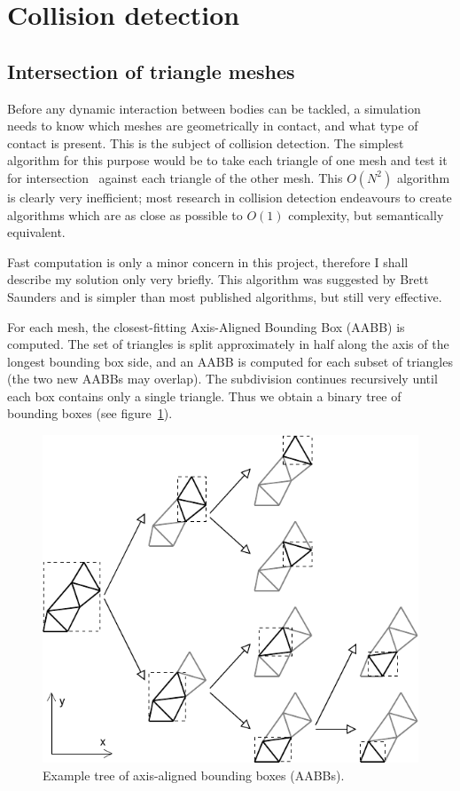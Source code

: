 \section{Collision detection\label{collisionDetection}}

\subsection{Intersection of triangle meshes}

Before any dynamic interaction between bodies can be tackled, a simulation needs to know which
meshes are geometrically in contact, and what type of contact is present. This is the subject
of collision detection. The simplest algorithm for this purpose would be to take each triangle
of one mesh and test it for intersection~\cite{Moeller:97} against each triangle of the other
mesh. This $O(N^2)$ algorithm is clearly very inefficient; most research in collision detection
endeavours to create algorithms which are as close as possible to $O(1)$ complexity, but
semantically equivalent.

Fast computation is only a minor concern in this project, therefore I shall describe my solution
only very briefly. This algorithm was suggested by Brett Saunders and is simpler than most
published algorithms, but still very effective.

For each mesh, the closest-fitting Axis-Aligned Bounding Box (AABB) is computed. The set of
triangles is split approximately in half along the axis of the longest bounding box side, and
an AABB is computed for each subset of triangles (the two new AABBs may overlap). The subdivision
continues recursively until each box contains only a single triangle. Thus we obtain a binary
tree of bounding boxes (see figure~\ref{collisionVolumes}).

\begin{figure}
\centerline{\includegraphics{figures/coll-volumes}}
\caption{Example tree of axis-aligned bounding boxes (AABBs).\label{collisionVolumes}}
\end{figure}

